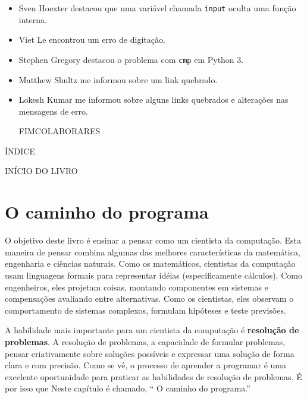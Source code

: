 \documentclass[10pt]{book}
\begin{document}
\begin {itemize}
\item Sven Hoexter destacou que uma variável chamada {\tt input}
oculta uma função interna.

\item Viet Le encontrou um erro de digitação.

\item Stephen Gregory destacou o problema com {\tt cmp}
em Python 3.

\item Matthew Shultz me informou sobre um link quebrado.

\item Lokesh Kumar me informou sobre alguns links quebrados e
alterações nas mensagens de erro.

FIMCOLABORARES

\end{itemize}

\normalsize
\clearemptydoublepage

ÍNDICE
\begin{latexonly}

\tableofcontents

\clearemptydoublepage

\end{latexonly}

INÍCIO DO LIVRO
\mainmatter

\chapter{O caminho do programa}

O objetivo deste livro é ensinar a pensar como um
cientista da computação. Esta maneira de pensar combina algumas das melhores características
da matemática, engenharia e ciências naturais. Como os matemáticos,
cientistas da computação usam linguagens formais para representar idéias (especificamente
cálculos). Como engenheiros, eles projetam coisas, montando componentes
em sistemas e compensações avaliando entre alternativas. Como os cientistas,
eles observam o comportamento de sistemas complexos, formulam hipóteses e teste
previsões.

A habilidade mais importante para um cientista da computação é {\bf
resolução de problemas}. A resolução de problemas, a capacidade de formular
problemas, pensar criativamente sobre soluções possíveis e expressar uma solução de forma clara
e com precisão. Como se vê, o processo de aprender a programar é uma
excelente oportunidade para praticar as habilidades de resolução de problemas. É por isso que
Neste capítulo é chamado, `` O caminho do programa.''
\end{document}

